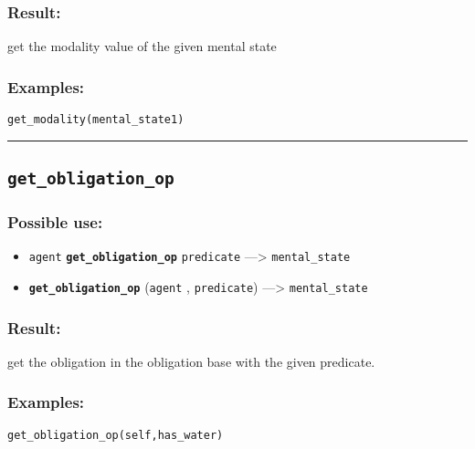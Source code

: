 \documentclass[]{book}
\providecommand{\tightlist}{%
  \setlength{\itemsep}{0pt}\setlength{\parskip}{0pt}}
\theoremstyle{definition}
\theoremstyle{definition}
\theoremstyle{definition}
\theoremstyle{remark}
\begin{document}
\subsubsection{Result:}\label{result-214}

get the modality value of the given mental state

\subsubsection{Examples:}\label{examples-167}

\begin{verbatim}
get_modality(mental_state1) 
\end{verbatim}

\begin{center}\rule{0.5\linewidth}{\linethickness}\end{center}

\subsection{\texorpdfstring{\texttt{get\_obligation\_op}}{get\_obligation\_op}}\label{get_obligation_op}

\subsubsection{Possible use:}\label{possible-use-221}

\begin{itemize}
\tightlist
\item
  \texttt{agent} \textbf{\texttt{get\_obligation\_op}}
  \texttt{predicate} ---\textgreater{} \texttt{mental\_state}
\item
  \textbf{\texttt{get\_obligation\_op}} (\texttt{agent} ,
  \texttt{predicate}) ---\textgreater{} \texttt{mental\_state}
\end{itemize}

\subsubsection{Result:}\label{result-215}

get the obligation in the obligation base with the given predicate.

\subsubsection{Examples:}\label{examples-168}

\begin{verbatim}
get_obligation_op(self,has_water) 
\end{verbatim}
\end{document}
